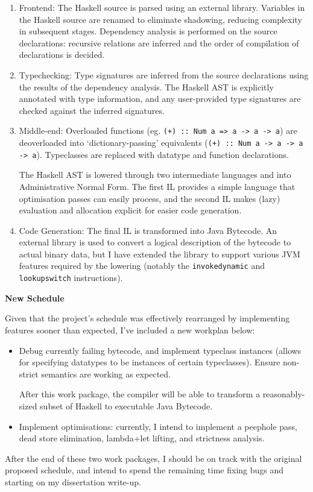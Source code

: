 \documentclass[11pt]{article}
\newcommand\haskell[1]{\texttt{#1}}
\newcommand\monospace[1]{\texttt{#1}}
\begin{document}
\begin{enumerate}
\item
{
    Frontend: The Haskell source is parsed using an external library. Variables in the Haskell source are renamed to
    eliminate shadowing, reducing complexity in subsequent stages. Dependency analysis is performed on the source
    declarations: recursive relations are inferred and the order of compilation of declarations is decided.
}
\item
{
    Typechecking: Type signatures are inferred from the source declarations using the results of the dependency
    analysis. The Haskell AST is explicitly annotated with type information, and any user-provided type signatures are
    checked against the inferred signatures.
}
\item
{
    Middle-end: Overloaded functions (eg. \haskell{(+) :: Num a => a -> a -> a}) are deoverloaded into
    `dictionary-passing' equivalents (\haskell{(+) :: Num a -> a -> a -> a}). Typeclasses are replaced with datatype
    and function declarations.

    The Haskell AST is lowered through two intermediate languages and into Administrative Normal Form. The first IL
    provides a simple language that optimisation passes can easily process, and the second IL makes (lazy) evaluation
    and allocation explicit for easier code generation.
}
\item
{
    Code Generation: The final IL is transformed into Java Bytecode. An external library is used to convert a logical
    description of the bytecode to actual binary data, but I have extended the library to support various JVM features 
    required by the lowering (notably the \monospace{invokedynamic} and \monospace{lookupswitch} instructions).
}
\end{enumerate}

\large{\bf New Schedule}

Given that the project's schedule was effectively rearranged by implementing features sooner than expected, I've
included a new workplan below:

\begin{itemize}
\item
{

    Debug currently failing bytecode, and implement typeclass instances (allows for specifying datatypes to be instances
    of certain typeclasses). Ensure non-strict semantics are working as expected.

    After this work package, the compiler will be able to transform a reasonably-sized subset of Haskell to executable
    Java Bytecode.
}
\item
{

    Implement optimisations: currently, I intend to implement a peephole pass, dead store elimination, lambda+let
    lifting, and strictness analysis.
}
\end{itemize}

After the end of these two work packages, I should be on track with the original proposed schedule, and intend to spend
the remaining time fixing bugs and starting on my dissertation write-up.
\end{document}
